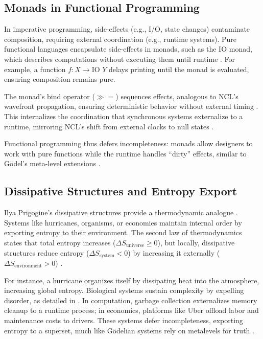 \documentclass{article}
\begin{document}
\subsection{Monads in Functional Programming}
In imperative programming, side-effects (e.g., I/O, state changes) contaminate composition, requiring external coordination (e.g., runtime systems). Pure functional languages encapsulate side-effects in monads, such as the IO monad, which describes computations without executing them until runtime \citep{wadler1992}. For example, a function \(f : X \to \text{IO } Y\) delays printing until the monad is evaluated, ensuring composition remains pure.

The monad's bind operator (\(\gg=\)) sequences effects, analogous to NCL's wavefront propagation, ensuring deterministic behavior without external timing \citep{turner1979}. This internalizes the coordination that synchronous systems externalize to a runtime, mirroring NCL's shift from external clocks to null states \citep{fant2005}.

Functional programming thus defers incompleteness: monads allow designers to work with pure functions while the runtime handles ``dirty'' effects, similar to G\"{o}del's meta-level extensions \citep{wadler1992}.

\subsection{Dissipative Structures and Entropy Export}
Ilya Prigogine's dissipative structures provide a thermodynamic analogue \citep{prigogine1984, nicolis1977}. Systems like hurricanes, organisms, or economies maintain internal order by exporting entropy to their environment. The second law of thermodynamics states that total entropy increases (\(\Delta S_{\text{universe}} \geq 0\)), but locally, dissipative structures reduce entropy (\(\Delta S_{\text{system}} < 0\)) by increasing it externally (\(\Delta S_{\text{environment}} > 0\)) \citep{nicolis1977}.

For instance, a hurricane organizes itself by dissipating heat into the atmosphere, increasing global entropy. Biological systems sustain complexity by expelling disorder, as detailed in \citet{schneider2005}. In computation, garbage collection externalizes memory cleanup to a runtime process; in economics, platforms like Uber offload labor and maintenance costs to drivers. These systems defer incompleteness, exporting entropy to a superset, much like G\"{o}delian systems rely on metalevels for truth \citep{tarski1956}.
\end{document}
